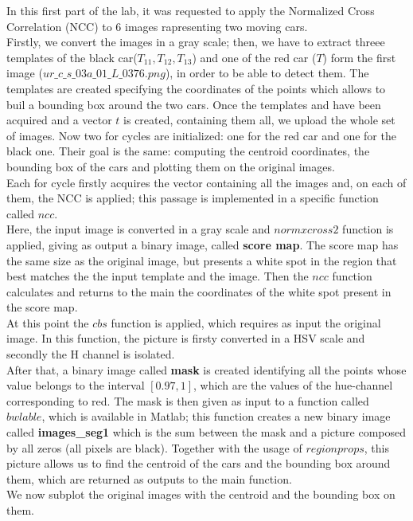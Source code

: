 In this first part of the lab, it was requested to apply the Normalized Cross Correlation (NCC) to 6 images 
rapresenting two moving cars.\\
Firstly, we convert the images in a gray scale; then, we have to extract threee templates of the black 
car($T_{11}, T_{12}, T_{13}$) and one of the red car ($T$) form 
the first image ($ur\_c\_s\_03a\_01\_L\_0376.png$), in order to be able to detect them.
The templates are created specifying the coordinates of the points which allows to buil a bounding box around the 
two cars. Once the templates and have been acquired and a vector 
$t$ is created, containing them all, we upload the whole set of images.
Now two for cycles are initialized: one for the red car and one for the black one. Their goal is the same: computing
the centroid coordinates, the bounding box of the cars
and plotting them on the original images.\\
Each for cycle firstly acquires the vector containing all the images and, on each of them, the NCC is applied; this 
passage is implemented in a specific function called $ncc$.\\ 
Here, the input image is converted in a gray scale and $normxcross2$ function is applied, giving as output a binary 
image, called \textbf{score map}. 
The score map has the same size as the original image, but presents a white spot in the region that best matches the 
the input template and the image.
Then the $ncc$ function calculates and returns to the main the coordinates of the white spot present in the score 
map.\\
At this point the $cbs$ function is applied, which requires as input the original image. In this function, the 
picture is firsty converted in a HSV scale and
secondly the H channel is isolated.\\
After that, a binary image called \textbf{mask} is created identifying all the points whose value belongs to the 
interval $[0.97, 1]$, which are the values of the hue-channel corresponding to red.
The mask is then given as input to a function called $bwlable$, which is available in Matlab; this function 
creates a new binary image called \textbf{images\_seg1} which is the sum 
between the mask and a picture composed by all zeros (all pixels are black). Together with the usage of 
$regionprops$, this picture allows us to find the centroid of the cars 
and the bounding box around them, which are returned as outputs to the main function.\\
We now subplot the original images with the centroid and the bounding box on them.


